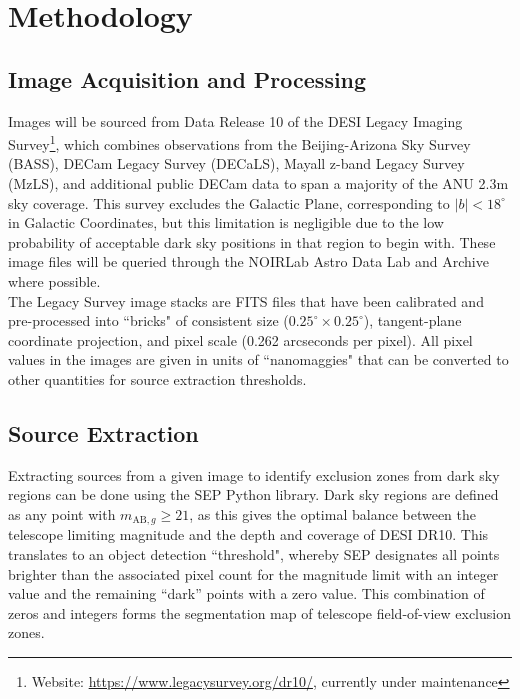 \documentclass[11pt]{article}
\begin{document}
\section{Methodology}

\subsection{Image Acquisition and Processing}

Images will be sourced from Data Release 10 of the DESI Legacy Imaging Survey\footnote{Website: \href{https://www.legacysurvey.org/dr10/}{https://www.legacysurvey.org/dr10/}, currently under maintenance}, which combines observations from the Beijing-Arizona Sky Survey (BASS), DECam Legacy Survey (DECaLS), Mayall z-band Legacy Survey (MzLS), and additional public DECam data to span a majority of the ANU 2.3m sky coverage. This survey excludes the Galactic Plane, corresponding to $|b|<18 ^\circ$ in Galactic Coordinates, but this limitation is negligible due to the low probability of acceptable dark sky positions in that region to begin with. These image files will be queried through the NOIRLab Astro Data Lab and Archive where possible. \\

The Legacy Survey image stacks are FITS files that have been calibrated and pre-processed into ``bricks" of consistent size ($0.25^\circ\times 0.25^\circ$), tangent-plane coordinate projection, and pixel scale (0.262 arcseconds per pixel). All pixel values in the images are given in units of ``nanomaggies" that can be converted to other quantities for source extraction thresholds.

\subsection{Source Extraction}
Extracting sources from a given image to identify exclusion zones from dark sky regions can be done using the SEP Python library. Dark sky regions are defined as any point with $m_{\text{AB},g}\geq21$, as this gives the optimal balance between the telescope limiting magnitude \cite{dopita_observing_nodate} and the depth and coverage of DESI DR10. This translates to an object detection ``threshold", whereby SEP designates all points brighter than the associated pixel count for the magnitude limit with an integer value and the remaining ``dark'' points with a zero value. This combination of zeros and integers forms the segmentation map of telescope field-of-view exclusion zones.
\end{document}
